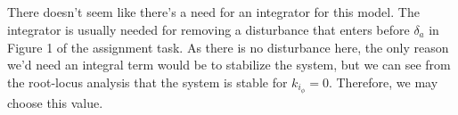 \subsection{}
There doesn't seem like there's a need for an integrator for this model. The integrator is usually needed for removing a disturbance that enters before $\delta_a$ in Figure 1 of the assignment task. As there is no disturbance here, the only reason we'd need an integral term would be to stabilize the system, but we can see from the root-locus analysis that the system is stable for $k_{i_\phi} = 0$. Therefore, we may choose this value. 

\subsection{}

